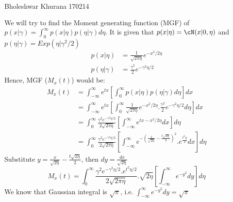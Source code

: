 \documentclass[a4paper,11pt]{article}
\begin{document}
{Bholeshwar Khurana}   %
{170214}	%

\begin{pmisolution}

We will try to find the Moment generating function (MGF) of $p(x|\gamma) = \int_{0}^{\infty}p(x|\eta)p(\eta|\gamma)d\eta$. It is given that $p(x|\eta) = \cN(x|0,\eta)$ and $p(\eta|\gamma) = Exp(\eta|\gamma^2/2)$
\begin{equation*}
\begin{split}
        p(x|\eta) &= \frac{1}{\sqrt{2\pi\eta}}e^{-x^2/2\eta} \\
        p(\eta|\gamma) &= \frac{\gamma^2}{2}e^{-\gamma^2\eta/2}
\end{split}
\end{equation*}
Hence, MGF ($M_x(t)$) would be:
\begin{equation*}
    \begin{split}
        M_x(t) &= \int_{-\infty}^{\infty} e^{tx} \left[ \int_{0}^{\infty}p(x|\eta)p(\eta|\gamma)d\eta \right] dx \\
        &= \int_{-\infty}^{\infty} e^{tx} \left[ \int_{0}^{\infty} \frac{1}{\sqrt{2\pi\eta}}e^{-x^2/2\eta}. \frac{\gamma^2}{2}e^{-\gamma^2\eta/2} d\eta \right] dx \\
        &= \int_{0}^{\infty} \frac{\gamma^2e^{-\gamma^2\eta/2}}{2\sqrt{2\pi\eta}} \left[ \int_{-\infty}^{\infty} e^{tx-x^2/2\eta} dx \right] d\eta \\
        &= \int_{0}^{\infty} \frac{\gamma^2e^{-\gamma^2\eta/2}}{2\sqrt{2\pi\eta}} \left[ \int_{-\infty}^{\infty} e^{-(\frac{x}{\sqrt{2\eta}} - \frac{t\sqrt{2\eta}}{2})^2}.e^{\frac{t^2\eta}{2}} dx \right] d\eta
    \end{split}
\end{equation*}
Substitute $y=\frac{x}{\sqrt{2\eta}} - \frac{t\sqrt{2\eta}}{2}$, then $dy = \frac{dx}{\sqrt{2\eta}}$
\begin{equation*}
    M_x(t) = \int_{0}^{\infty} \frac{\gamma^2e^{-\gamma^2\eta/2}.e^{t^2\eta/2}}{2\sqrt{2\pi\eta}}.\sqrt{2\eta} \left[ \int_{-\infty}^{\infty} e^{-y^2}dy \right] d\eta
\end{equation*}
We know that Gaussian integral is $\sqrt{\pi}$, i.e. $\int_{-\infty}^{\infty} e^{-y^2}dy = \sqrt{\pi}$
\begin{equation*}
\begin{split}

\end{split}
\end{equation*}
\end{pmisolution}
\end{document}
